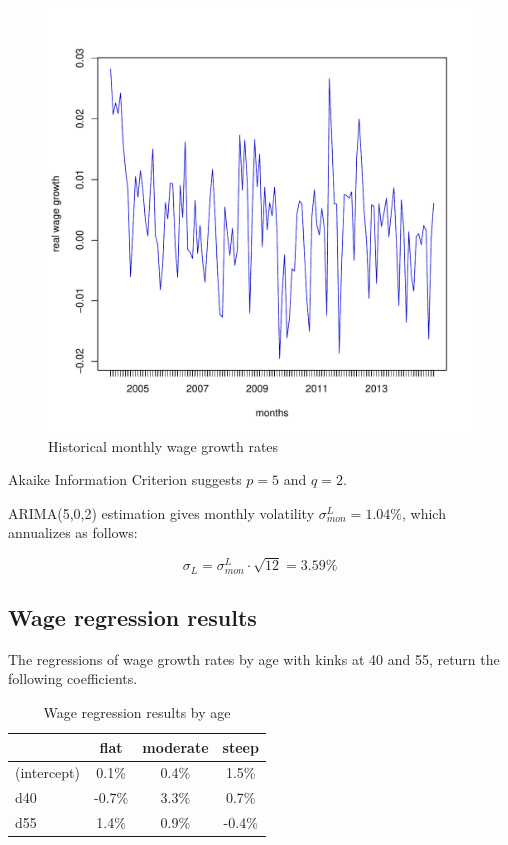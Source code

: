 \documentclass[]{elsarticle}
\begin{document}
\begin{appendix}
\begin{figure}[h!]
	\centering
	\includegraphics[scale=0.3]{figs/wagediff.pdf}
	\caption{Historical monthly wage growth rates}
	\label{fig:wagediff}
\end{figure}

Akaike Information Criterion suggests $p=5$ and $q=2$.

ARIMA(5,0,2) estimation gives monthly volatility $\sigma^L_{mon} = 1.04\%$, which annualizes as follows:

\begin{equation}
	\sigma_L = \sigma^L_{mon} \cdot \sqrt{12} = 3.59 \%
\end{equation}


\subsection{Wage regression results}
\label{paramcalibt}

The regressions of wage growth rates by age with kinks at 40 and 55, return the following coefficients.

\begin{table}[H]
	\centering
	\caption[]{Wage regression results by age}
	\begin{tabular}[c]{lccc}
		\hline
		&flat&moderate&steep\\
		\hline
		(intercept)&0.1\%&0.4\%&1.5\%\\
		d40&-0.7\%&3.3\%&0.7\%\\
		d55&1.4\%&0.9\%&-0.4\%\\
		\hline
	\end{tabular}
\end{table}


\end{appendix}
\end{document}
